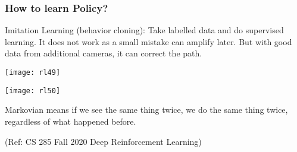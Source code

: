 \begin{frame}[fragile]\frametitle{How to learn Policy?}

Imitation Learning (behavior cloning): Take labelled data and do supervised learning. It does not work as a small mistake can amplify later. But with good data from additional cameras, it can correct the path.


\begin{center}
\texttt{[image: rl49]}

\texttt{[image: rl50]}

\end{center}

Markovian means if we see the same thing twice, we do the same thing twice, regardless of what happened before.


{\tiny (Ref: CS 285 Fall 2020 Deep Reinforcement Learning)}

\end{frame}











